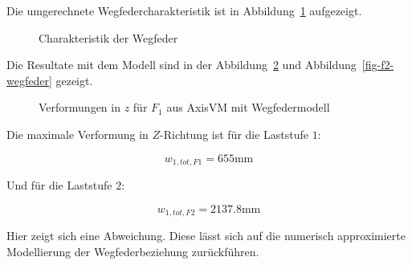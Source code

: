 \documentclass[
  10pt,
  letterpaper,
]{scrreprt}
\begin{document}
Die umgerechnete Wegfedercharakteristik ist in
Abbildung~\ref{fig-wegfeder-force} aufgezeigt.

\begin{figure}[H]


\caption{\label{fig-wegfeder-force}Charakteristik der Wegfeder}

\end{figure}%

Die Resultate mit dem Modell sind in der Abbildung~\ref{fig-f1-wegfeder}
und Abbildung~\ref{fig-f2-wegfeder} gezeigt.

\begin{figure}[H]


\caption{\label{fig-f1-wegfeder}Verformungen in \(z\) für \(F_1\) aus
AxisVM mit Wegfedermodell}

\end{figure}%

Die maximale Verformung in \(Z\)-Richtung ist für die Laststufe \(1\):

\[
w_{1,tot,F1} = 655 \text{mm}
\]

Und für die Laststufe \(2\):

\[
w_{1,tot,F2} = 2137.8 \text{mm}
\]

Hier zeigt sich eine Abweichung. Diese lässt sich auf die numerisch
approximierte Modellierung der Wegfederbeziehung zurückführen.
\end{document}

